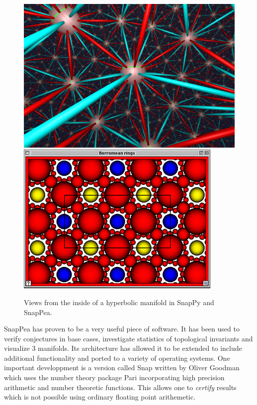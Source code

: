 \documentclass[14pt,fleqn]{article}
\begin{document}
 \begin{figure}[H]
  \centering
  \subfloat  
{\includegraphics[scale=.25]{snappy1.png} 
}
 \hfill
  \subfloat
  {\includegraphics[scale=.47]{SnapPea-horocusp_view.png} 
}

{\small Views from the inside of a hyperbolic manifold in SnapPy and SnapPea.}

\end{figure} 

SnapPea has proven to be a very useful piece of software. It has been used to verify conjectures in base cases, 
investigate statistics of topological invariants and visualize 3 manifolds.
Its architecture has allowed it to be extended to include additional functionality
\cite{snappy} and ported to a variety of operating systems.
One important developpment is a version
called Snap written by Oliver Goodman \cite{snap}
which uses  the number theory package Pari incorporating  high precision arithmetic and number theoretic functions. 
This allows one to \textit{certify}
results 
which is not possible using
ordinary floating point arithemetic.
\end{document}
